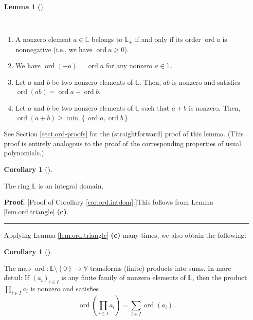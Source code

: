 \documentclass[numbers=enddot,12pt,final,onecolumn,notitlepage]{scrartcl}%
\theoremstyle{definition}
\newtheorem{lem}[theo]{Lemma}
\newenvironment{lemma}[1][]
{\begin{lem}[#1]\begin{leftbar}}
{\end{leftbar}\end{lem}}
\newtheorem{coro}[theo]{Corollary}
\newenvironment{corollary}[1][]
{\begin{coro}[#1]\begin{leftbar}}
{\end{leftbar}\end{coro}}
\newenvironment{proof}[1][Proof]{\noindent\textbf{#1.} }{\ \rule{0.5em}{0.5em}}
\let\sumnonlimits\sum
\let\prodnonlimits\prod
\renewcommand{\sum}{\sumnonlimits\limits}
\renewcommand{\prod}{\prodnonlimits\limits}
\renewcommand{\geq}{\geqslant}
\theoremstyle{plainsl}
\begin{document}
\begin{lemma}
\label{lem.ord.triangle}\ 

\begin{enumerate}
\item[\textbf{(a)}] A nonzero element $a\in\mathbb{L}$ belongs to
$\mathbb{L}_{+}$ if and only if its order $\operatorname*{ord}a$ is
nonnegative (i.e., we have $\operatorname*{ord}a\geq0$).

\item[\textbf{(b)}] We have $\operatorname*{ord}\left(  -a\right)
=\operatorname*{ord}a$ for any nonzero $a\in\mathbb{L}$.

\item[\textbf{(c)}] Let $a$ and $b$ be two nonzero elements of $\mathbb{L}$.
Then, $ab$ is nonzero and satisfies $\operatorname*{ord}\left(  ab\right)
=\operatorname*{ord}a+\operatorname*{ord}b$.

\item[\textbf{(d)}] Let $a$ and $b$ be two nonzero elements of $\mathbb{L}$
such that $a+b$ is nonzero. Then, $\operatorname*{ord}\left(  a+b\right)
\geq\min\left\{  \operatorname*{ord}a,\operatorname*{ord}b\right\}  $.
\end{enumerate}
\end{lemma}

See Section \ref{sect.ord-proofs} for the (straightforward) proof of this
lemma. (This proof is entirely analogous to the proof of the corresponding
properties of usual polynomials.)

\begin{corollary}
\label{cor.ord.intdom}The ring $\mathbb{L}$ is an integral domain.
\end{corollary}

\begin{proof}
[Proof of Corollary \ref{cor.ord.intdom}.]This follows from Lemma
\ref{lem.ord.triangle} \textbf{(c)}.
\end{proof}

Applying Lemma \ref{lem.ord.triangle} \textbf{(c)} many times, we also obtain
the following:

\begin{corollary}
\label{cor.ord.prod-to-sum}The map $\operatorname*{ord}:\mathbb{L}%
\setminus\left\{  0\right\}  \rightarrow\mathbb{V}$ transforms (finite)
products into sums. In more detail: If $\left(  a_{i}\right)  _{i\in I}$ is
any finite family of nonzero elements of $\mathbb{L}$, then the product
$\prod_{i\in I}a_{i}$ is nonzero and satisfies%
\[
\operatorname*{ord}\left(  \prod_{i\in I}a_{i}\right)  =\sum_{i\in
I}\operatorname*{ord}\left(  a_{i}\right)  .
\]

\end{corollary}
\end{document}
